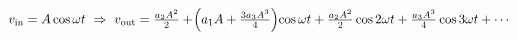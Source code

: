 \documentclass[preview]{standalone}
\begin{document}
\begin{align*}
\special{dvisvgm:raw <g id='unique000'>}v_{\rm in}=A\cos\omega t\ \Rightarrow\ v_{\rm out}=\tfrac{a_2 A^2}{2}+\!\left(a_1 A+\tfrac{3a_3 A^3}{4}\right)\!\cos\omega t+\tfrac{a_2 A^2}{2}\cos 2\omega t+\tfrac{a_3 A^3}{4}\cos 3\omega t+\cdots\special{dvisvgm:raw </g>}
\end{align*}
\end{document}
